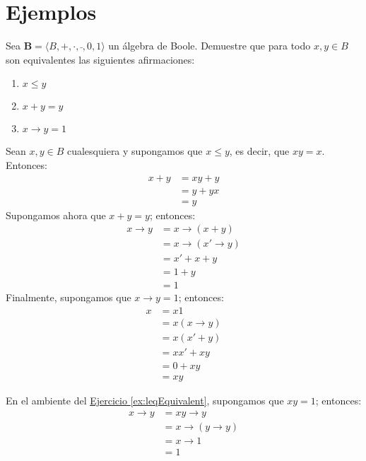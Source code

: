 \section{Ejemplos}

\begin{exercise}
  \label{ex:leqEquivalent}
  Sea $\mathbf{B}=\langle B,+,\cdot,\bar{\ },0,1\rangle$ un álgebra de
  Boole. Demuestre que para todo $x,y\in B$ son equivalentes las
  siguientes afirmaciones:
  \begin{enumerate}
  \item $x\leq y$
  \item $x+y=y$
  \item $x\to y=1$
  \end{enumerate}
\end{exercise}

\begin{solution}
  Sean $x,y\in B$ cualesquiera y supongamos que $x\leq y$, es decir,
  que $xy=x$. Entonces:
  \begin{align*}
    x+y&=xy+y\\
       &=y+yx\\
       &=y
  \end{align*}
Supongamos ahora que $x+y=y$; entonces:
\begin{align*}
  x\to y&=x\to(x+y)\\
        &=x\to(x'\to y)\\
        &=x'+x+y\\
        &=1+y\\
        &=1
\end{align*}
Finalmente, supongamos que $x\to y=1$; entonces:
\begin{align*}
  x&=x1\\
   &=x(x\to y)\\
   &=x(x'+y)\\
   &=xx'+xy\\
   &=0+xy\\
   &=xy
\end{align*}
\end{solution}

\begin{remark}
  En el ambiente del \hyperref[ex:leqEquivalent]{Ejercicio
    \ref*{ex:leqEquivalent}}, supongamos que $xy=1$; entonces:
  \begin{align*}
    x\to y&=xy\to y\\
          &=x\to(y\to y)\\
          &=x\to 1\\
          &=1
  \end{align*}
\end{remark}

